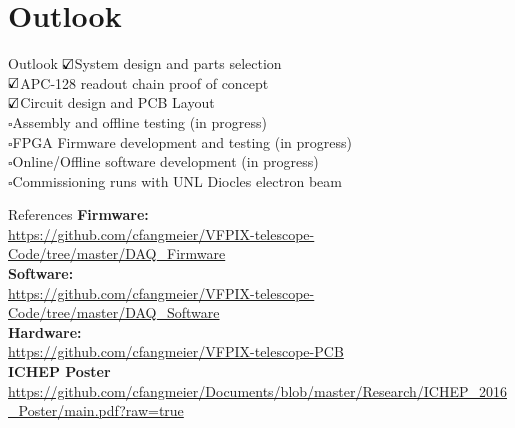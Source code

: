 \documentclass{beamer}
\newcommand{\checkedbox}{$\text{\rlap{$\checkmark$}}\square$}
\newcommand{\checkbox}{$\square$}
\begin{document}
\section{Outlook}
\begin{frame}{Outlook}
\checkedbox System design and parts selection \\
\checkedbox APC-128 readout chain proof of concept\\
\checkedbox Circuit design and PCB Layout \\
\checkbox Assembly and offline testing (in progress)\\
\checkbox FPGA Firmware development and testing (in progress) \\
\checkbox Online/Offline software development (in progress) \\
\checkbox Commissioning runs with UNL Diocles electron beam
\end{frame}

\begin{frame}{References}
\textbf{Firmware: } \\
    \small{\url{https://github.com/cfangmeier/VFPIX-telescope-Code/tree/master/DAQ_Firmware}} \\
\textbf{Software: } \\
    \url{https://github.com/cfangmeier/VFPIX-telescope-Code/tree/master/DAQ_Software} \\
\textbf{Hardware: } \\
    \url{https://github.com/cfangmeier/VFPIX-telescope-PCB}\\
\textbf{ICHEP Poster} \\
    \url{https://github.com/cfangmeier/Documents/blob/master/Research/ICHEP_2016_Poster/main.pdf?raw=true}
\end{frame}
\end{document}
